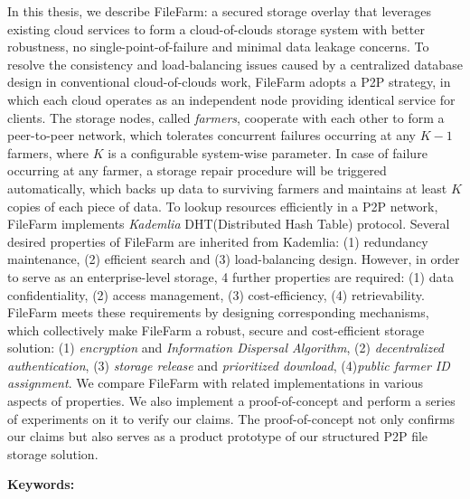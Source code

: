 \begin{abstracten}
  In this thesis, we describe FileFarm: a secured storage overlay that leverages existing cloud services to form a cloud-of-clouds storage system with better robustness, no single-point-of-failure and minimal data leakage concerns. To resolve the consistency and load-balancing issues caused by a centralized database design in conventional cloud-of-clouds work, FileFarm adopts a P2P strategy, in which each cloud operates as an independent node providing identical service for clients. The storage nodes, called \textit{farmers}, cooperate with each other to form a peer-to-peer network, which tolerates concurrent failures occurring at any $K-1$ farmers, where $K$ is a configurable system-wise parameter. In case of failure occurring at any farmer, a storage repair procedure will be triggered automatically, which backs up data to surviving farmers and maintains at least $K$ copies of each piece of data. To lookup resources efficiently in a P2P network, FileFarm implements \textit{Kademlia} DHT(Distributed Hash Table) protocol\cite{maymounkov2002kademlia}. Several desired properties of FileFarm are inherited from Kademlia: (1) redundancy maintenance, (2) efficient search and (3) load-balancing design. However, in order to serve as an enterprise-level storage, 4 further properties are required: (1) data confidentiality, (2) access management, (3) cost-efficiency, (4) retrievability. FileFarm meets these requirements by designing corresponding mechanisms, which collectively make FileFarm a robust, secure and cost-efficient storage solution: (1) \textit{encryption} and \textit{Information Dispersal Algorithm}, (2) \textit{decentralized authentication}, (3) \textit{storage release} and \textit{prioritized download}, (4)\textit{public farmer ID assignment}. We compare FileFarm with related implementations in various aspects of properties. We also implement a proof-of-concept and perform a series of experiments on it to verify our claims.  The proof-of-concept not only confirms our claims but also serves as a product prototype of our structured P2P file storage solution.

\bigbreak
\noindent \textbf{Keywords:}{\, \makeatletter \@keywordsen \makeatother}
\end{abstracten}
